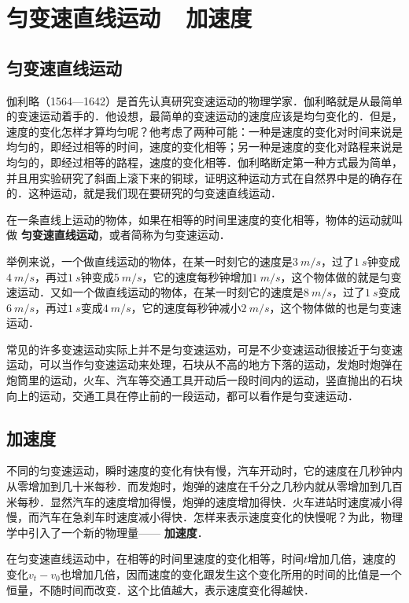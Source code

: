 \newpage

\section{匀变速直线运动~~加速度}

\subsection{匀变速直线运动}

伽利略（1564—1642）是首先认真研究变速运动的物理学家．伽利略就是从最简单的变速运动着手的．他设想，最简单的变速运动的速度应该是均匀变化的．但是，速度的变化怎样才算均匀呢？他考虑了两种可能：一种是速度的变化对时间来说是均匀的，即经过相等的时间，速度的变化相等；另一种是速度的变化对路程来说是均匀的，即经过相等的路程，速度的变化相等．伽利略断定第一种方式最为简单，并且用实验研究了斜面上滚下来的铜球，证明这种运动方式在自然界中是的确存在的．这种运动，就是我们现在要研究的匀变速直线运动．

在一条直线上运动的物体，如果在相等的时间里速度的变化相等，物体的运动就叫做\textbf{ 匀变速直线运动}，或者简称为匀变速运动．

举例来说，一个做直线运动的物体，在某一时刻它的速度是$\qty{3}{m/s}$，过了$\qty{1}{s}$钟变成$\qty{4}{m/s}$，再过$\qty{1}{s}$钟变成$\qty{5}{m/s}$，它的速度每秒钟增加$\qty{1}{m/s}$，这个物体做的就是匀变速运动．又如一个做直线运动的物体，在某一时刻它的速度是$\qty{8}{m/s}$，过了$\qty{1}{s}$变成$\qty{6}{m/s}$，再过$\qty{1}{s}$变成$\qty{4}{m/s}$，它的速度每秒钟减小$\qty{2}{m/s}$，这个物体做的也是匀变速运动．

常见的许多变速运动实际上并不是匀变速运劝，可是不少变速运动很接近于匀变速运动，可以当作匀变速运动来处理，石块从不高的地方下落的运动，发炮时炮弹在炮筒里的运动，火车、汽车等交通工具开动后一段时间内的运动，竖直抛出的石块向上的运动，交通工具在停止前的一段运动，都可以看作是匀变速运动．

\subsection{加速度}

不同的匀变速运动，瞬时速度的变化有快有慢，汽车开动时，它的速度在几秒钟内从零增加到几十米每秒．而发炮时，炮弹的速度在千分之几秒内就从零增加到几百米每秒．显然汽车的速度增加得慢，炮弹的速度增加得快．火车进站时速度减小得慢，而汽车在急刹车时速度减小得快．怎样来表示速度变化的快慢呢？为此，物理学中引入了一个新的物理量——\textbf{ 加速度}．

在匀变速直线运动中，在相等的时间里速度的变化相等，时间$t$增加几倍，速度的变化$v_t-v_0$也增加几倍，因而速度的变化跟发生这个变化所用的时间的比值是一个恒量，不随时间而改变．这个比值越大，表示速度变化得越快．

